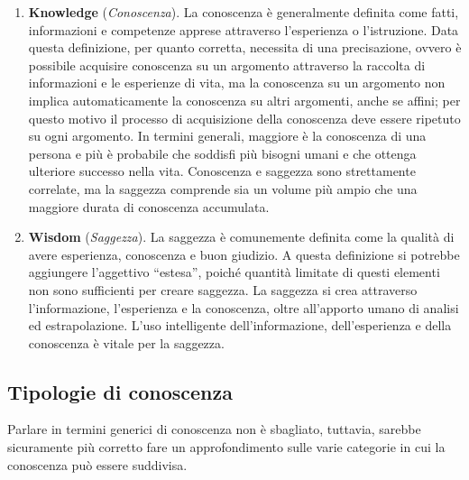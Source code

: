 \begin{enumerate}
    \item \textbf{Knowledge} (\textit{Conoscenza}). La conoscenza è generalmente definita come fatti, informazioni e competenze apprese attraverso l’esperienza o l’istruzione. Data questa definizione, per quanto corretta, necessita di una precisazione, ovvero è possibile acquisire conoscenza su un argomento attraverso la raccolta di informazioni e le esperienze di vita, ma la conoscenza su un argomento non implica automaticamente la conoscenza su altri argomenti, anche se affini; per questo motivo il processo di acquisizione della conoscenza deve essere ripetuto su ogni argomento. In termini generali, maggiore è la conoscenza di una persona e più è probabile che soddisfi più bisogni umani e che ottenga ulteriore successo nella vita. Conoscenza e saggezza sono strettamente correlate, ma la saggezza comprende sia un volume più ampio che una maggiore durata di conoscenza accumulata.
    \item \textbf{Wisdom} (\textit{Saggezza}). La saggezza è comunemente definita come la qualità di avere esperienza, conoscenza e buon giudizio. A questa definizione si potrebbe aggiungere l’aggettivo “estesa”, poiché quantità limitate di questi elementi non sono sufficienti per creare saggezza. La saggezza si crea attraverso l’informazione, l’esperienza e la conoscenza, oltre all’apporto umano di analisi ed estrapolazione. L’uso intelligente dell’informazione, dell’esperienza e della conoscenza è vitale per la saggezza.
\end{enumerate}

\subsection{Tipologie di conoscenza}

Parlare in termini generici di conoscenza non è sbagliato, tuttavia, sarebbe sicuramente più corretto fare un approfondimento sulle varie categorie in cui la conoscenza può essere suddivisa.\cite{getguru_types_of_knowledge}

